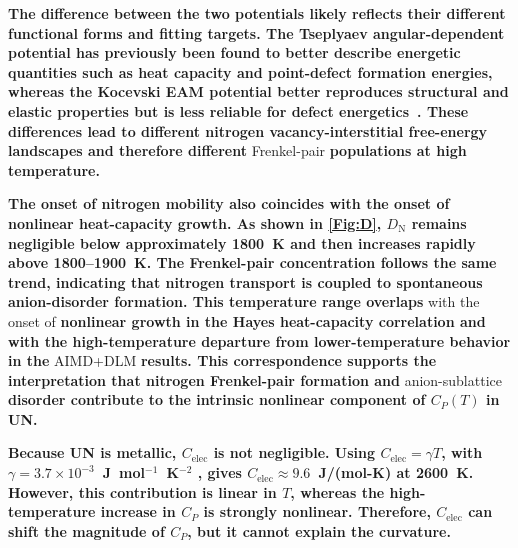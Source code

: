\documentclass[preprint,12pt,sort&compress]{elsarticle}
\newcommand{\?}{\stackrel{?}{=}}
\providecommand{\DIFaddtex}[1]{{\bf #1}} %
\providecommand{\DIFdeltex}[1]{} %
\providecommand{\DIFaddbegin}{\protect\color{blue}} %
\providecommand{\DIFaddend}{\protect\color{black}} %
\providecommand{\DIFdelbegin}{\protect\color{red}} %
\providecommand{\DIFdelend}{\protect\color{black}} %
\providecommand{\DIFadd}[1]{\texorpdfstring{\DIFaddtex{#1}}{#1}} %
\providecommand{\DIFdel}[1]{\texorpdfstring{\DIFdeltex{#1}}{}} %
\newcommand{\DIFscaledelfig}{0.5}
\newlength{\DIFdelgraphicswidth} %
\newlength{\DIFdelgraphicsheight} %
\newcommand{\DIFaddincludegraphics}[2][]{{\color{blue}\fbox{\DIFOincludegraphics[#1]{#2}}}} %
\newcommand{\DIFdelincludegraphics}[2][]{%
\sbox{\DIFdelgraphicsbox}{\DIFOincludegraphics[#1]{#2}}%
\settoboxwidth{\DIFdelgraphicswidth}{\DIFdelgraphicsbox} %
\settoboxtotalheight{\DIFdelgraphicsheight}{\DIFdelgraphicsbox} %
\scalebox{\DIFscaledelfig}{%
\parbox[b]{\DIFdelgraphicswidth}{\usebox{\DIFdelgraphicsbox}\\[-\baselineskip] \rule{\DIFdelgraphicswidth}{0em}}\llap{\resizebox{\DIFdelgraphicswidth}{\DIFdelgraphicsheight}{%
\setlength{\unitlength}{\DIFdelgraphicswidth}%
\begin{picture}(1,1)%
\thicklines\linethickness{2pt} %
{\color[rgb]{1,0,0}\put(0,0){\framebox(1,1){}}}%
{\color[rgb]{1,0,0}\put(0,0){\line( 1,1){1}}}%
{\color[rgb]{1,0,0}\put(0,1){\line(1,-1){1}}}%
\end{picture}%
}\hspace*{3pt}}} %
} %
\DeclareRobustCommand{\DIFaddbegin}{\DIFOaddbegin \let\includegraphics\DIFaddincludegraphics} %
\DeclareRobustCommand{\DIFaddend}{\DIFOaddend \let\includegraphics\DIFOincludegraphics} %
\DeclareRobustCommand{\DIFdelbegin}{\DIFOdelbegin \let\includegraphics\DIFdelincludegraphics} %
\DeclareRobustCommand{\DIFdelend}{\DIFOaddend \let\includegraphics\DIFOincludegraphics} %
\begin{document}
\DIFdelbegin \DIFdel{A key observation is that the temperature range in which both the nitrogen diffusivity and }\DIFdelend \DIFaddbegin \DIFadd{The difference between the two potentials likely reflects their different functional forms and fitting targets. The Tseplyaev angular-dependent potential has previously been found to better describe energetic quantities such as heat capacity and point-defect formation energies, whereas the Kocevski EAM potential better reproduces structural and elastic properties but is less reliable for defect energetics~\cite{AbdulHameed2024}. These differences lead to different nitrogen vacancy-interstitial free-energy landscapes and therefore different }\DIFaddend Frenkel-pair \DIFdelbegin \DIFdel{concentration increase most rapidly (roughly 1800--2000~K) coincides }\DIFdelend \DIFaddbegin \DIFadd{populations at high temperature.
}

\DIFadd{The onset of nitrogen mobility also coincides with the onset of nonlinear heat-capacity growth. As shown in \cref{Fig:D}, $D_\mathrm{N}$ remains negligible below approximately 1800~K and then increases rapidly above 1800--1900~K. The Frenkel-pair concentration follows the same trend, indicating that nitrogen transport is coupled to spontaneous anion-disorder formation. This temperature range overlaps }\DIFaddend with the onset of \DIFdelbegin \DIFdel{deviations from a purely phononic heat capacity in experiment and }\DIFdelend \DIFaddbegin \DIFadd{nonlinear growth in the Hayes heat-capacity correlation and with the high-temperature departure from lower-temperature behavior in the }\DIFaddend AIMD+DLM \DIFdelbegin \DIFdel{. This parallel behavior strongly suggests that UN undergoes a form of }\DIFdelend \DIFaddbegin \DIFadd{results. This correspondence supports the interpretation that nitrogen Frenkel-pair formation and }\DIFaddend anion-sublattice \DIFdelbegin \DIFdel{disordering crossover at high temperature, qualitatively analogous to the oxygen superionic transition in UO$_2$. }\DIFdelend \DIFaddbegin \DIFadd{disorder contribute to the intrinsic nonlinear component of $C_P(T)$ in UN.
}\DIFaddend 

\DIFaddbegin \DIFadd{Because UN is metallic, $C_{\mathrm{elec}}$ is not negligible. Using $C_{\mathrm{elec}}=\gamma T$, with $\gamma=3.7\times10^{-3}$~J~mol$^{-1}$~K$^{-2}$ \cite{Samsel2007}, gives $C_{\mathrm{elec}}\approx 9.6$~J/(mol-K) at 2600~K. However, this contribution is linear in $T$, whereas the high-temperature increase in $C_P$ is strongly nonlinear. Therefore, $C_{\mathrm{elec}}$ can shift the magnitude of $C_P$, but it cannot explain the curvature. 
}\DIFaddend 
\end{document}
